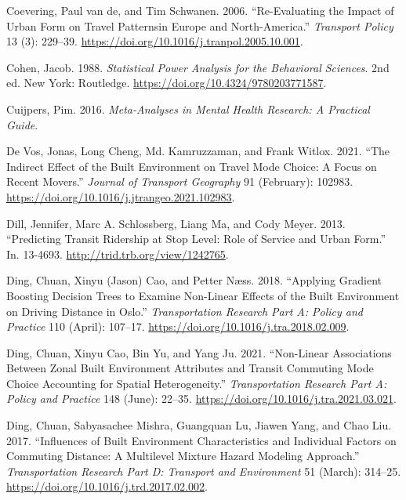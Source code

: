 \documentclass[
  11pt,
  openany]{memoir}
\newlength{\cslhangindent}
\newlength{\cslentryspacingunit} %
\newenvironment{CSLReferences}[2] %
 {%
  \setlength{\parindent}{0pt}
  \ifodd #1
  \let\oldpar\par
  \def\par{\hangindent=\cslhangindent\oldpar}
  \fi
  \setlength{\parskip}{#2\cslentryspacingunit}
 }%
 {}
\begin{document}
\begin{CSLReferences}{1}{0}
\leavevmode{}%
Coevering, Paul van de, and Tim Schwanen. 2006. {``Re-Evaluating the Impact of Urban Form on Travel Patternsin {Europe} and {North}-{America}.''} \emph{Transport Policy} 13 (3): 229--39. \url{https://doi.org/10.1016/j.tranpol.2005.10.001}.

\leavevmode{}%
Cohen, Jacob. 1988. \emph{Statistical {Power Analysis} for the {Behavioral Sciences}}. 2nd ed. {New York}: {Routledge}. \url{https://doi.org/10.4324/9780203771587}.

\leavevmode{}%
Cuijpers, Pim. 2016. \emph{Meta-Analyses in Mental Health Research: A Practical Guide}.

\leavevmode{}%
De Vos, Jonas, Long Cheng, Md. Kamruzzaman, and Frank Witlox. 2021. {``The Indirect Effect of the Built Environment on Travel Mode Choice: A Focus on Recent Movers.''} \emph{Journal of Transport Geography} 91 (February): 102983. \url{https://doi.org/10.1016/j.jtrangeo.2021.102983}.

\leavevmode{}%
Dill, Jennifer, Marc A. Schlossberg, Liang Ma, and Cody Meyer. 2013. {``Predicting {Transit Ridership} at {Stop Level}: Role of {Service} and {Urban Form}.''} In. 13-4693. \url{http://trid.trb.org/view/1242765}.

\leavevmode{}%
Ding, Chuan, Xinyu (Jason) Cao, and Petter Næss. 2018. {``Applying Gradient Boosting Decision Trees to Examine Non-Linear Effects of the Built Environment on Driving Distance in {Oslo}.''} \emph{Transportation Research Part A: Policy and Practice} 110 (April): 107--17. \url{https://doi.org/10.1016/j.tra.2018.02.009}.

\leavevmode{}%
Ding, Chuan, Xinyu Cao, Bin Yu, and Yang Ju. 2021. {``Non-Linear Associations Between Zonal Built Environment Attributes and Transit Commuting Mode Choice Accounting for Spatial Heterogeneity.''} \emph{Transportation Research Part A: Policy and Practice} 148 (June): 22--35. \url{https://doi.org/10.1016/j.tra.2021.03.021}.

\leavevmode{}%
Ding, Chuan, Sabyasachee Mishra, Guangquan Lu, Jiawen Yang, and Chao Liu. 2017. {``Influences of Built Environment Characteristics and Individual Factors on Commuting Distance: A Multilevel Mixture Hazard Modeling Approach.''} \emph{Transportation Research Part D: Transport and Environment} 51 (March): 314--25. \url{https://doi.org/10.1016/j.trd.2017.02.002}.


\end{CSLReferences}
\end{document}
